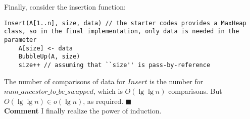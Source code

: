 \documentclass[12pt]{article}
\begin{document}
Finally, consider the insertion function:
\begin{lstlisting}
Insert(A[1..n], size, data) // the starter codes provides a MaxHeap class, so in the final implementation, only data is needed in the parameter
	A[size] <- data
	BubbleUp(A, size)
	size++ // assuming that ``size'' is pass-by-reference
\end{lstlisting}
The number of comparisons of data for $Insert$ is the number for $num\_ancestor\_to\_be\_swapped$, which is $O(\lg\lg n)$ comparisons.
But $O(\lg\lg n) \in o(\lg n)$, as required.
\hfill $\blacksquare$\\
{\bf Comment} I finally realize the power of induction.
\end{document}
